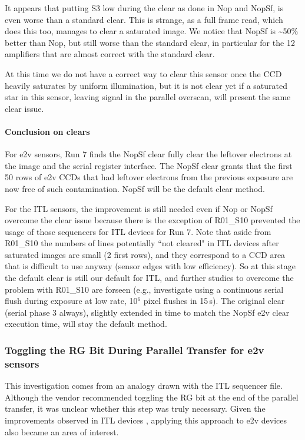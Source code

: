 It appears that putting S3 low during the clear as done in Nop and NopSf,
is even worse than a standard clear. This is strange, as a full frame
read, which does this too, manages to clear a saturated image. We notice
that NopSf is \textasciitilde50\% better than Nop, but still worse than
the standard clear, in particular for the 12 amplifiers that are almost correct
with the standard clear.

At this time we do not have a correct way to clear this
sensor once the CCD heavily saturates by uniform illumination, but it is not
clear yet if a saturated star in this sensor, leaving signal in the
parallel overscan, will present the same clear issue.

\paragraph{Conclusion on clears}\label{conclusion}
For e2v sensors, Run 7 finds the NopSf clear fully clear the leftover electrons at the image and the serial register interface.
The NopSf clear grants that the first 50 rows of e2v CCDs that had leftover electrons from the previous exposure are now free of such contamination. NopSf will be the default clear method.

For the ITL sensors, the improvement is still needed even if Nop or NopSf overcome the clear issue because there is the exception of R01\_S10 prevented the usage of those sequencers for ITL devices for Run 7. Note that
aside from R01\_S10 the numbers of lines potentially
``not cleared" in ITL devices after saturated images are small (2 first rows), and they
correspond to a CCD area that is difficult to use anyway (sensor edges with low
efficiency). So at this stage the default clear is still our default
for ITL, and further studies to overcome the problem with
R01\_S10 are forseen (e.g., investigate using a continuous
serial flush during exposure at low rate, 10$^6$ pixel flushes in 15\,s).
The original clear (serial phase 3 always), slightly extended in time to match the NopSf e2v clear execution time, will stay the default method.

\subsubsection{Toggling the RG Bit During Parallel Transfer for e2v sensors}\label{noRGe2v}
This investigation comes from an analogy drawn with the ITL sequencer file. Although the vendor recommended toggling the RG bit at the end of the parallel transfer, it was unclear whether this step was truly necessary. Given the improvements observed in ITL devices \citep{2024SPIE13103E..0WU}, applying this approach to e2v devices also became an area of interest.

